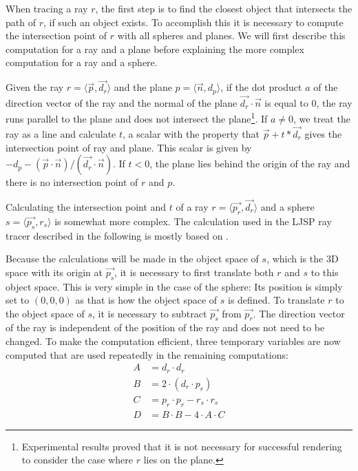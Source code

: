 \documentclass[11pt]{report}
\begin{document}
When tracing a ray $r$, the first step is to find the closest object that intersects the path of $r$, if such an object exists. To accomplish this it is necessary to compute the intersection point of $r$ with all spheres and planes. We will first describe this computation for a ray and a plane before explaining the more complex computation for a ray and a sphere.

Given the ray $r = \langle \vec{p}, \vec{d_r} \rangle$ and the plane $p = \langle \vec{n}, d_p \rangle$, if the dot product $a$ of the direction vector of the ray and the normal of the plane $\vec{d_r} \cdot \vec{n}$ is equal to $0$, the ray runs parallel to the plane and does not intersect the plane\footnote{Experimental results proved that it is not necessary for successful rendering to consider the case where $r$ lies on the plane.}. If $a \neq 0$, we treat the ray as a line and calculate $t$, a scalar with the property that $\vec{p} + t*\vec{d_r}$ gives the intersection point of ray and plane. This scalar is given by $-d_p-(\vec{p} \cdot \vec{n}) / (\vec{d_r} \cdot \vec{n})$. If $t < 0$, the plane lies behind the origin of the ray and there is no intersection point of $r$ and $p$.

Calculating the intersection point and $t$ of a ray $r = \langle \vec{p_r}, \vec{d_r} \rangle$ and a sphere $s = \langle \vec{p_s}, r_s \rangle$ is somewhat more complex. The calculation used in the LJSP ray tracer described in the following is mostly based on \cite{Pharr:2010:PBR:1854996}.

Because the calculations will be made in the object space of $s$, which is the 3D space with its origin at $\vec{p_s}$, it is necessary to first translate both $r$ and $s$ to this object space. This is very simple in the case of the sphere: Its position is simply set to $(0,0,0)$ as that is how the object space of $s$ is defined. To translate $r$ to the object space of $s$, it is necessary to subtract $\vec{p_s}$ from $\vec{p_r}$. The direction vector of the ray is independent of the position of the ray and does not need to be changed. To make the computation efficient, three temporary variables are now computed that are used repeatedly in the remaining computations:
\begin{equation*}
\begin{aligned}
A &= d_r \cdot d_r\\
B &= 2 \cdot (d_r \cdot p_r)\\
C &= p_r \cdot p_r - r_s \cdot r_s\\
D &= B \cdot B - 4 \cdot A \cdot C
\end{aligned}
\end{equation*}
\end{document}
